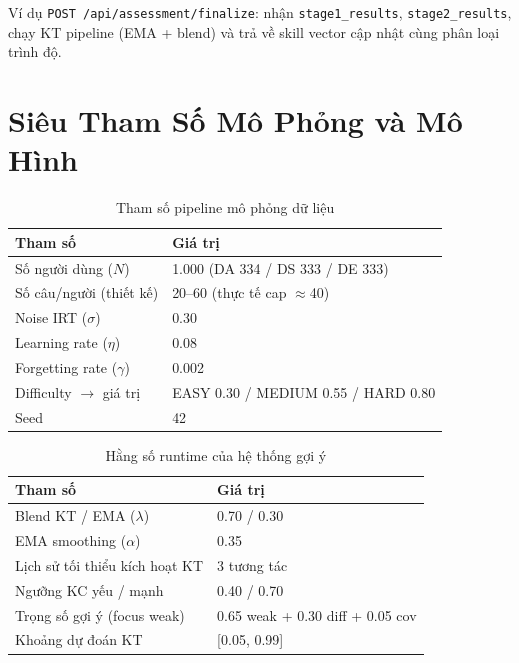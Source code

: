 \documentclass[12pt, a4paper]{report}
\begin{document}
Ví dụ \texttt{POST /api/assessment/finalize}: nhận \texttt{stage1\_results}, \texttt{stage2\_results}, chạy KT pipeline (EMA + blend) và trả về skill vector cập nhật cùng phân loại trình độ.

\section{Siêu Tham Số Mô Phỏng và Mô Hình}
\label{apx:hparams}

\begin{table}[H]
  \centering
  \caption{Tham số pipeline mô phỏng dữ liệu}
  \begin{tabular}{ll}
    \toprule
    \textbf{Tham số} & \textbf{Giá trị} \\
    \midrule
    Số người dùng ($N$)            & 1.000 (DA 334 / DS 333 / DE 333) \\
    Số câu/người (thiết kế)        & 20--60 (thực tế cap $\approx$40) \\
    Noise IRT ($\sigma$)           & 0.30 \\
    Learning rate ($\eta$)         & 0.08 \\
    Forgetting rate ($\gamma$)     & 0.002 \\
    Difficulty $\to$ giá trị       & EASY 0.30 / MEDIUM 0.55 / HARD 0.80 \\
    Seed                           & 42 \\
    \bottomrule
  \end{tabular}
\end{table}

\begin{table}[H]
  \centering
  \caption{Hằng số runtime của hệ thống gợi ý}
  \begin{tabular}{ll}
    \toprule
    \textbf{Tham số} & \textbf{Giá trị} \\
    \midrule
    Blend KT / EMA ($\lambda$)        & 0.70 / 0.30 \\
    EMA smoothing ($\alpha$)          & 0.35 \\
    Lịch sử tối thiểu kích hoạt KT    & 3 tương tác \\
    Ngưỡng KC yếu / mạnh              & 0.40 / 0.70 \\
    Trọng số gợi ý (focus weak)       & 0.65 weak + 0.30 diff + 0.05 cov \\
    Khoảng dự đoán KT                 & [0.05, 0.99] \\
    \bottomrule
  \end{tabular}
\end{table}
\end{document}
